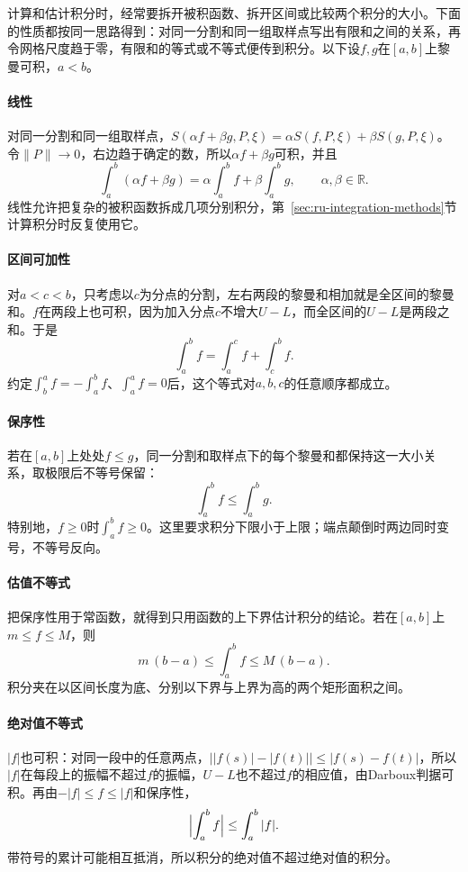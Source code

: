 计算和估计积分时，经常要拆开被积函数、拆开区间或比较两个积分的大小。下面的性质都按同一思路得到：对同一分割和同一组取样点写出有限和之间的关系，再令网格尺度趋于零，有限和的等式或不等式便传到积分。以下设$f,g$在$[a,b]$上黎曼可积，$a<b$。

\paragraph{线性}
对同一分割和同一组取样点，$S(\alpha f+\beta g,P,\xi)=\alpha S(f,P,\xi)+\beta S(g,P,\xi)$。令$\|P\|\to0$，右边趋于确定的数，所以$\alpha f+\beta g$可积，并且
\[
 \int_a^b(\alpha f+\beta g)=\alpha\int_a^bf+\beta\int_a^bg,\qquad\alpha,\beta\in\mathbb R.
\]
线性允许把复杂的被积函数拆成几项分别积分，第~\ref{sec:ru-integration-methods}节计算积分时反复使用它。

\paragraph{区间可加性}
对$a<c<b$，只考虑以$c$为分点的分割，左右两段的黎曼和相加就是全区间的黎曼和。$f$在两段上也可积，因为加入分点$c$不增大$U-L$，而全区间的$U-L$是两段之和。于是
\[
 \int_a^bf=\int_a^cf+\int_c^bf.
\]
约定$\int_b^af=-\int_a^bf$、$\int_a^af=0$后，这个等式对$a,b,c$的任意顺序都成立。

\paragraph{保序性}
若在$[a,b]$上处处$f\leq g$，同一分割和取样点下的每个黎曼和都保持这一大小关系，取极限后不等号保留：
\[
 \int_a^bf\leq\int_a^bg.
\]
特别地，$f\geq0$时$\int_a^bf\geq0$。这里要求积分下限小于上限；端点颠倒时两边同时变号，不等号反向。

\paragraph{估值不等式}
把保序性用于常函数，就得到只用函数的上下界估计积分的结论。若在$[a,b]$上$m\leq f\leq M$，则
\[
 m\,(b-a)\leq\int_a^bf\leq M\,(b-a).
\]
积分夹在以区间长度为底、分别以下界与上界为高的两个矩形面积之间。

\paragraph{绝对值不等式}
$|f|$也可积：对同一段中的任意两点，$\bigl||f(s)|-|f(t)|\bigr|\leq|f(s)-f(t)|$，所以$|f|$在每段上的振幅不超过$f$的振幅，$U-L$也不超过$f$的相应值，由Darboux判据可积。再由$-|f|\leq f\leq|f|$和保序性，
\[
 \Bigl|\int_a^bf\Bigr|\leq\int_a^b|f|.
\]
带符号的累计可能相互抵消，所以积分的绝对值不超过绝对值的积分。

